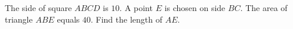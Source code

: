 The side of square $ABCD$ is $10$. A point $E$ is chosen on side $BC$. The area of triangle $ABE$ equals $40$. Find the length of $AE$.
